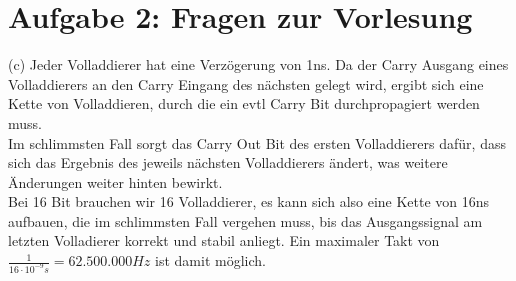 \documentclass[a4paper]{scrartcl}
\begin{document}
	\section*{Aufgabe 2: Fragen zur Vorlesung}
	
	(c) Jeder Volladdierer hat eine Verzögerung von 1ns. Da der Carry Ausgang eines Volladdierers an den Carry Eingang des nächsten gelegt wird, ergibt sich eine Kette von Volladdieren, durch die ein evtl Carry Bit durchpropagiert werden muss.\\
	Im schlimmsten Fall sorgt das Carry Out Bit des ersten Volladdierers dafür, dass sich das Ergebnis des jeweils nächsten Volladdierers ändert, was weitere Änderungen weiter hinten bewirkt.\\
	Bei 16 Bit brauchen wir 16 Volladdierer, es kann sich also eine Kette von 16ns aufbauen, die im schlimmsten Fall vergehen muss, bis das Ausgangssignal am letzten Volladierer korrekt und stabil anliegt. Ein maximaler Takt von $\frac{1}{16 \cdot 10 ^{-9}s} = 62.500.000Hz$ ist damit möglich. 
\end{document}
